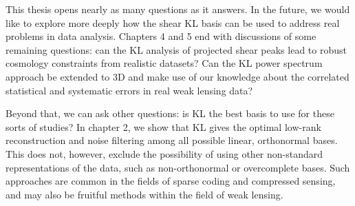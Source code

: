 This thesis opens nearly as many questions as it answers.  In the future,
we would like to explore more deeply how the shear KL basis can be used to
address real problems in data analysis.  Chapters 4 and 5 end with discussions
of some remaining questions: can the KL analysis of projected shear peaks
lead to robust cosmology constraints from realistic datasets?  Can the 
KL power spectrum approach be extended to 3D and make use of our knowledge
about the correlated statistical and systematic errors in real weak lensing
data?

Beyond that, we can ask other questions: is KL the best basis to use for these
sorts of studies?  In chapter 2, we show that KL gives the optimal low-rank
reconstruction and noise filtering among all possible linear, orthonormal
bases.  This does not, however, exclude the possibility of using other
non-standard representations of the data, such as non-orthonormal or
overcomplete bases.  Such approaches are common in the fields of sparse
coding and compressed sensing, and may also be fruitful methods within the
field of weak lensing.
